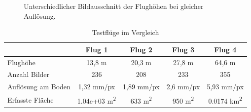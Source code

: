 \blindtext



\begin{figure}[htb]
\caption{Unterschiedlicher Bildausschnitt der Flughöhen bei gleicher Auflösung.}
  \label{fig:gleicherausschnitt}
\end{figure}

\blindtext

\begin{table}[hbt]
\selectfont
\begin{tabular}{lcccc} %
\textbf{} & \textbf{Flug 1} & \textbf{Flug 2}  & \textbf{Flug 3} & \textbf{Flug 4} \\ %
\hline\hline
Flughöhe & 13,8 m & 20,3 m & 27,8 m & 64,6 m \\
Anzahl Bilder & 236 & 208 & 233 & 355 \\
Auflösung am Boden & 1,32 mm/px & 1,89 mm/px & 2,6 mm/px & 5,93 mm/px \\
Erfasste Fläche & 1.04e+03 m\textsuperscript{2} & 633 m\textsuperscript{2} & 950 m\textsuperscript{2} & 0.0174 km\textsuperscript{2} \\

\hline
\end{tabular}
\caption{Testflüge im Vergleich}
\label{tab:flugvergleich}
\end{table}
